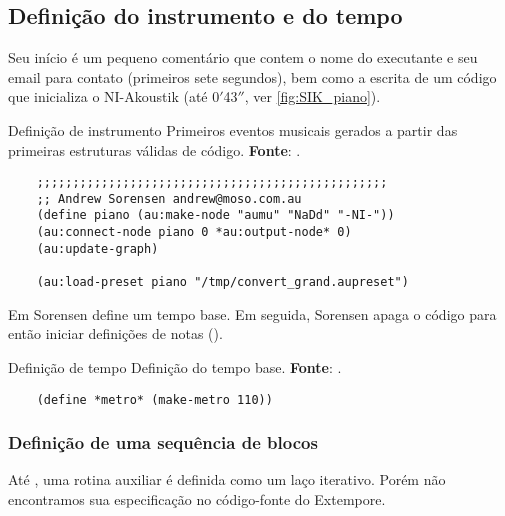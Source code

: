 \subsection{Definição do instrumento e do tempo}\label{sec:define_instr}

Seu início é um pequeno comentário que contem o nome do executante e seu email para contato (primeiros sete segundos), bem como a escrita de um código que inicializa o NI-Akoustik (até 0$'$43$''$, ver \autoref{fig:SIK_piano}). 

\begin{example}{Definição de instrumento}
  \centering 
Primeiros eventos musicais gerados a partir das primeiras estruturas válidas de código. \textbf{Fonte}: \cite{sorensen_youtube_2014}.
  \begin{verbatim}
    ;;;;;;;;;;;;;;;;;;;;;;;;;;;;;;;;;;;;;;;;;;;;;;;;;
    ;; Andrew Sorensen andrew@moso.com.au
    (define piano (au:make-node "aumu" "NaDd" "-NI-"))
    (au:connect-node piano 0 *au:output-node* 0)
    (au:update-graph)

    (au:load-preset piano "/tmp/convert_grand.aupreset")
  \end{verbatim}
  \label{fig:SIK_piano}
\end{example}


Em  Sorensen define um tempo base. Em seguida, Sorensen apaga o código para então iniciar definições de notas ().

\begin{example}{Definição de tempo}\label{ex:def_tempo}
  \centering
  Definição do tempo base. \textbf{Fonte}: \cite{sorensen_youtube_2014}.
  \begin{verbatim}
    (define *metro* (make-metro 110))
  \end{verbatim}
  
\end{example}

\subsubsection{Definição de uma sequência de blocos}

Até , uma rotina auxiliar é definida como um laço iterativo. Porém não encontramos sua especificação no código-fonte do Extempore.

